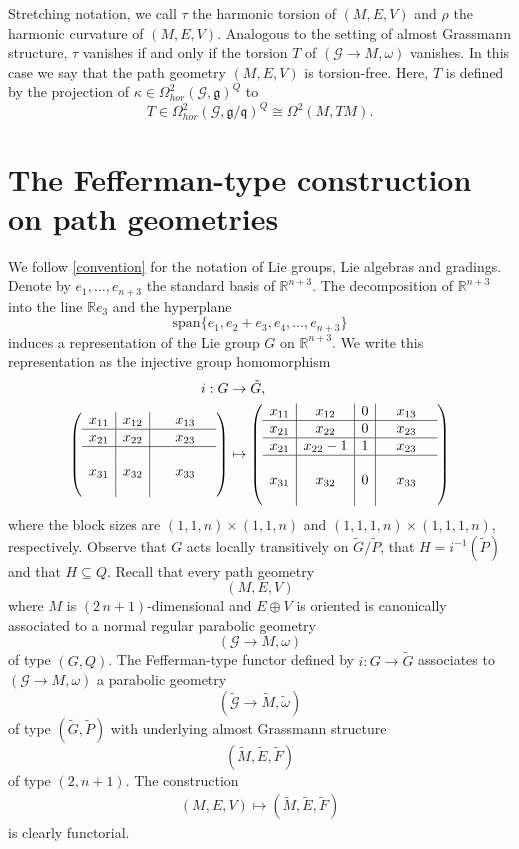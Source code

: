 \documentclass[11pt]{amsart}
\begin{document}
Stretching notation, we call $\tau$ the harmonic torsion of $(M,E,V)$ and $\rho$ the harmonic curvature of $(M,E,V)$. Analogous to the setting of almost Grassmann structure, $\tau$ vanishes if and only if the torsion $T$ of $(\mathcal G\to M,\omega)$ vanishes. In this case we say that the path geometry $(M,E,V)$ is torsion-free. Here, $T$ is defined by the projection of $\kappa\in\Omega^2_{hor}(\mathcal G,\mathfrak g)^Q$ to 
\[T\in\Omega^2_{hor}(\mathcal G,\mathfrak g/\mathfrak q)^Q\cong\Omega^2(M,TM).\] 

\section{The Fefferman-type construction on path geometries}\label{The Fefferman-type constructions}
We follow \cref{convention} for the notation of Lie groups, Lie algebras and gradings. Denote by $e_1,\dots,e_{n+3}$ the standard basis of $\mathbb R^{n+3}$. The decomposition of $\mathbb R^{n+3}$ into the line $\mathbb R e_3$ and the hyperplane 
\[\mathrm{span}\{e_1,e_2+e_3,e_4,\dots,e_{n+3}\}\] induces a representation of the Lie group $G$ on $\mathbb R^{n+3}$. We write this representation as the injective group homomorphism
\begin{align}\label{i}
i:G&\to \tilde G,\\
	\left(\begin{array}{c|c|ccc}
		x_{11}&x_{12}& &x_{13}&\\
		\hline x_{21}&x_{22}& &x_{23}&\\
		\hline  & & & &\\
		x_{31}&x_{32}&\ &x_{33}&\\
		&&&&
	\end{array}\right)&\mapsto\left(\begin{array}{c|c|c|ccc}
		x_{11}&x_{12}&0& &x_{13}&\\
		\hline x_{21}&x_{22}&0& &x_{23}&\\
		\hline x_{21}&x_{22}-1&1& &x_{23}&\\
		\hline &&&&\\
		x_{31}&x_{32}&0& &x_{33}&\\
		&&&&&
	\end{array}\right)\nonumber
\end{align}
where the block sizes are $(1,1,n)\times(1,1,n)$ and $(1,1,1,n)\times(1,1,1,n)$, respectively. Observe that $G$ acts locally transitively on $\tilde G/\tilde P$, that $H=i^{-1}(\tilde P)$ and that $H\subseteq Q$. Recall that every path geometry \[(M,E,V)\] where $M$ is $(2\,n+1)$-dimensional and $E\oplus V$ is oriented is canonically associated to a normal regular parabolic geometry \[(\mathcal G\to M,\omega)\] of type $(G,Q)$. The Fefferman-type functor defined by $i:G\to\tilde G$ associates to $(\mathcal G\to M,\omega)$ a parabolic geometry \[(\tilde{\mathcal G}\to\tilde M,\tilde\omega)\] of type $(\tilde G,\tilde P)$ with underlying almost Grassmann structure \[(\tilde M,\tilde E,\tilde F)\] of type $(2,n+1)$. The construction
\begin{align}\label{functor1}
(M,E,V)\mapsto(\tilde M,\tilde E,\tilde F)
\end{align}
is clearly functorial.
\end{document}

